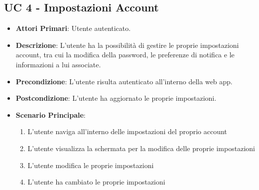 	\subsection{UC 4 - Impostazioni Account}
		
		
		\begin{itemize}
			\item \textbf{Attori Primari}: Utente autenticato.
			\item \textbf{Descrizione}: L'utente ha la possibilità di gestire le proprie impostazioni account, tra cui la modifica della password, le preferenze di notifica e le informazioni a lui associate.
			\item \textbf{Precondizione}: L'utente risulta autenticato all'interno della web app.
			\item \textbf{Postcondizione}: L'utente ha aggiornato le proprie impostazioni.
			\item \textbf{Scenario Principale}:
			\begin{enumerate}
				\item{L'utente naviga all'interno delle impostazioni del proprio account}
				\item{L'utente visualizza la schermata per la modifica delle proprie impostazioni}
				\item{L'utente modifica le proprie impostazioni}
				\item{L'utente ha cambiato le proprie impostazioni}
			\end{enumerate}	
		\end{itemize}
			

